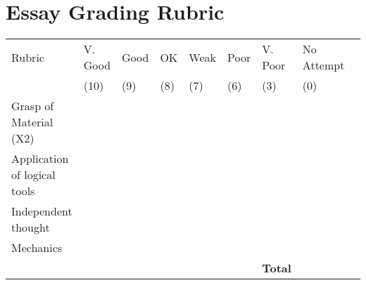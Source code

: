 \documentclass{article}[12pt]
\begin{document}
\thispagestyle{fancy}

\section*{Essay Grading Rubric}
\begin{center}


\resizebox{19cm}{!} {
    \begin{tabular}{ | l | l | l | l | l | l | l | l | l |    }
    \hline
    Rubric &  V. Good & Good & OK & Weak & Poor & V. Poor & No Attempt \\  
	 & (10) & (9) & (8) & (7) & (6) & (3)  & (0) \\    \hline
    Grasp of Material (X2) & & & & & & &\\ \hline   
    Application of logical tools &  & & & & & &\\ \hline
	Independent thought &  & & & & & &\\ \hline
 Mechanics & & & & & &  &\\ \hline \hline
 & &  & & &  & \textbf{Total}  & \\ \hline
    \end{tabular}
}


\end{center}
\end{document}
